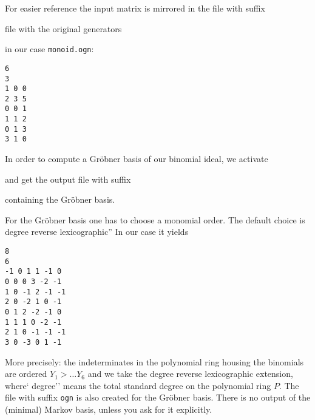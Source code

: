 For easier reference the input matrix is mirrored in the file with suffix 
\begin{itemize}
	\itemtt[ogn] file with the original generators
\end{itemize}
in our case \verb|monoid.ogn|:
\begin{Verbatim}
6
3
1 0 0 
2 3 5 
0 0 1 
1 1 2 
0 1 3 
3 1 0
\end{Verbatim}

In order to compute a Gröbner basis of our binomial ideal, we activate
\begin{itemize}
	\itemtt[GroebnerBasis]
\end{itemize}
and get the output file with suffix
\begin{itemize}
	\itemtt[grb] containing the Gröbner basis.
\end{itemize}
For the Gröbner basis one has to choose a monomial order. The default choice is degree reverse lexicographic'' In our case it yields
\begin{Verbatim}
8
6
-1 0 1 1 -1 0 
0 0 0 3 -2 -1 
1 0 -1 2 -1 -1 
2 0 -2 1 0 -1 
0 1 2 -2 -1 0 
1 1 1 0 -2 -1 
2 1 0 -1 -1 -1 
3 0 -3 0 1 -1 
\end{Verbatim}
More precisely: the indeterminates in the polynomial ring housing the binomials are ordered $Y_1 > \dots Y_6$ and we take the degree reverse lexicographic extension, where`  degree'' means the total standard degree on the polynomial ring $P$. The file with suffix \verb|ogn| is also created for the Gröbner basis. There is no output of the (minimal) Markov basis, unless you ask for it explicitly. 

